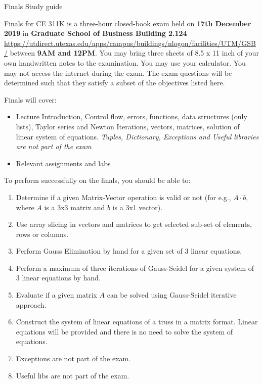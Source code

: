 \documentclass[]{article}
\begin{document}
\begin{center}
\Large Finals Study guide
\end{center}

Finals for CE 311K is a three-hour closed-book exam held on \textbf{17th December 2019} in \textbf{Graduate School of Business Building 2.124} \url{https://utdirect.utexas.edu/apps/campus/buildings/nlogon/facilities/UTM/GSB/} between \textbf{9AM and 12PM}. You may bring three sheets of 8.5 x 11 inch of your own handwritten notes to the examination. You may use your calculator. You may not access the internet during the exam. The exam questions will be determined such that they satisfy a subset of the objectives listed here.

Finals will cover:
\begin{itemize}
	\item Lecture Introduction, Control flow, errors, functions, data structures (only lists), Taylor series and Newton Iterations, vectors, matrices, solution of linear system of equations. \textit{Tuples, Dictionary, Exceptions and Useful libraries are not part of the exam}
	\item Relevant assignments and labs
\end{itemize}

To perform successfully on the finals, you should be able to:

\begin{enumerate}
	\item Determine if a given Matrix-Vector operation is valid or not (for e.g., $A\cdot b$, where $A$ is a 3x3 matrix and $b$ is a 3x1 vector).
	\item Use array slicing in vectors and matrices to get selected sub-set of elements, rows or columns.
	\item Perform Gauss Elimination by hand for a given set of 3 linear equations.
	\item Perform a maximum of three iterations of Gauss-Seidel for a given system of 3 linear equations by hand.
	\item Evaluate if a given matrix $A$ can be solved using Gauss-Seidel iterative approach.
	\item Construct the system of linear equations of a truss in a matrix format. Linear equations will be provided and there is no need to solve the system of equations.
	\item Exceptions are not part of the exam.
	\item Useful libs are not part of the exam.
\end{enumerate}
\end{document}
